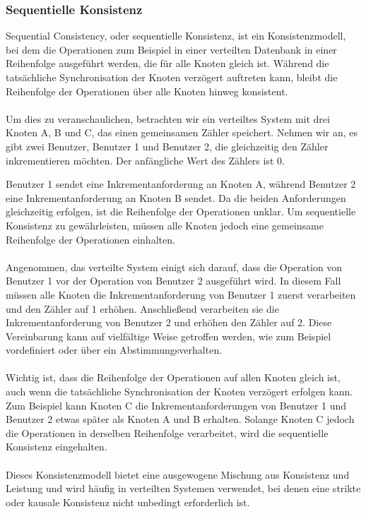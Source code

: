 \subsubsection{Sequentielle Konsistenz}
Sequential Consistency, oder sequentielle Konsistenz, ist ein Konsistenzmodell, bei dem die Operationen zum Beispiel in einer verteilten Datenbank in einer Reihenfolge ausgeführt werden, die für alle Knoten gleich ist. Während die tatsächliche Synchronisation der Knoten verzögert auftreten kann, bleibt die Reihenfolge der Operationen über alle Knoten hinweg konsistent.
\\\\
Um dies zu veranschaulichen, betrachten wir ein verteiltes System mit drei Knoten A, B und C, das einen gemeinsamen Zähler speichert. Nehmen wir an, es gibt zwei Benutzer, Benutzer 1 und Benutzer 2, die gleichzeitig den Zähler inkrementieren möchten. Der anfängliche Wert des Zählers ist 0.

Benutzer 1 sendet eine Inkrementanforderung an Knoten A, während Benutzer 2 eine Inkrementanforderung an Knoten B sendet. Da die beiden Anforderungen gleichzeitig erfolgen, ist die Reihenfolge der Operationen unklar. Um sequentielle Konsistenz zu gewährleisten, müssen alle Knoten jedoch eine gemeinsame Reihenfolge der Operationen einhalten.
\\\\
Angenommen, das verteilte System einigt sich darauf, dass die Operation von Benutzer 1 vor der Operation von Benutzer 2 ausgeführt wird. In diesem Fall müssen alle Knoten die Inkrementanforderung von Benutzer 1 zuerst verarbeiten und den Zähler auf 1 erhöhen. Anschließend verarbeiten sie die Inkrementanforderung von Benutzer 2 und erhöhen den Zähler auf 2.
Diese Vereinbarung kann auf vielfältige Weise getroffen werden, wie zum Beispiel vordefiniert oder über ein Abstimmungsverhalten. 
\\\\
Wichtig ist, dass die Reihenfolge der Operationen auf allen Knoten gleich ist, auch wenn die tatsächliche Synchronisation der Knoten verzögert erfolgen kann. Zum Beispiel kann Knoten C die Inkrementanforderungen von Benutzer 1 und Benutzer 2 etwas später als Knoten A und B erhalten. Solange Knoten C jedoch die Operationen in derselben Reihenfolge verarbeitet, wird die sequentielle Konsistenz eingehalten.
\\\\
Dieses Konsistenzmodell bietet eine ausgewogene Mischung aus Konsistenz und Leistung und wird häufig in verteilten Systemen verwendet, bei denen eine strikte oder kausale Konsistenz nicht unbedingt erforderlich ist.


